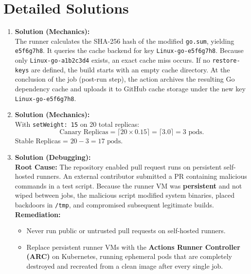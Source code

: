 \section{Detailed Solutions}
\begin{enumerate}[leftmargin=18pt]
  \item \textbf{Solution (Mechanics):}\\
  The runner calculates the SHA-256 hash of the modified \texttt{go.sum}, yielding \texttt{e5f6g7h8}. It queries the cache backend for key \texttt{Linux-go-e5f6g7h8}. Because only \texttt{Linux-go-a1b2c3d4} exists, an exact cache miss occurs. If no \texttt{restore-keys} are defined, the build starts with an empty cache directory. At the conclusion of the job (post-run step), the action archives the resulting Go dependency cache and uploads it to GitHub cache storage under the new key \texttt{Linux-go-e5f6g7h8}.

  \item \textbf{Solution (Mechanics):}\\
  With \texttt{setWeight: 15} on 20 total replicas:
  \begin{equation*}
  \text{Canary Replicas} = \lceil 20 \times 0.15 \rceil = \lceil 3.0 \rceil = 3 \text{ pods}.
  \end{equation*}
  Stable Replicas = $20 - 3 = 17 \text{ pods}$.

  \item \textbf{Solution (Debugging):}\\
  \textbf{Root Cause:} The repository enabled pull request runs on persistent self-hosted runners. An external contributor submitted a PR containing malicious commands in a test script. Because the runner VM was \textbf{persistent} and not wiped between jobs, the malicious script modified system binaries, placed backdoors in \texttt{/tmp}, and compromised subsequent legitimate builds.\\
  \textbf{Remediation:}
  \begin{itemize}[leftmargin=12pt]
    \item Never run public or untrusted pull requests on self-hosted runners.
    \item Replace persistent runner VMs with the \textbf{Actions Runner Controller (ARC)} on Kubernetes, running ephemeral pods that are completely destroyed and recreated from a clean image after every single job.
  \end{itemize}


\end{enumerate}
